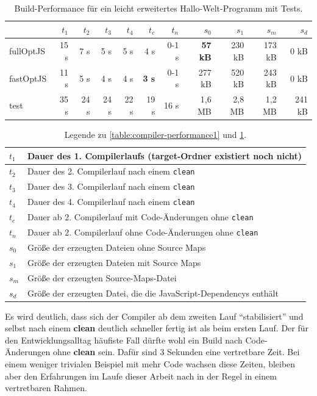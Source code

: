 \documentclass[a4paper, 12pt, hidelinks, listof=totoc, listoftables=totoc, bibliography=totoc]{scrreprt}
\newcommand{\code}[1]{\lstinline[language=Scala, style=inline]|#1|}
\begin{document}
\begin{table}[!h]
\begin{tabular}{|l|r|r|r|r|r|r||r|r|r|r|}
\hline           & $t_1$ & $t_2$ & $t_3$ & $t_4$ & $t_c$         & $t_n$ & $s_0$          & $s_1$  & $s_m$  & $s_d$ \\ 
\hline fullOptJS & 15 s  &  7 s  &  5 s  &  5 s  &          4 s  & 0-1 s & \textbf{57 kB} & 230 kB & 173 kB &   0 kB \\ 
\hline fastOptJS & 11 s  &  5 s  &  4 s  &  4 s  &  \textbf{3 s} & 0-1 s &        277 kB  & 520 kB & 243 kB &   0 kB \\ 
\hline test      & 35 s  & 24 s  & 24 s  & 22 s  &         19 s  &  16 s &        1,6 MB  & 2,8 MB & 1,2 MB & 241 kB \\ 
\hline 
\end{tabular} 
\caption{Build-Performance für ein leicht erweitertes Hallo-Welt-Programm mit Tests.}
\label{table:compiler-performance2}
\end{table}

\begin{table}[!h]
\begin{tabular}{|l|l|}
\hline $t_1$ & Dauer des 1. Compilerlaufs (target-Ordner existiert noch nicht) \\ 
\hline $t_2$ & Dauer des 2. Compilerlauf nach einem \code{clean} \\ 
\hline $t_3$ & Dauer des 3. Compilerlauf nach einem \code{clean} \\ 
\hline $t_4$ & Dauer des 4. Compilerlauf nach einem \code{clean} \\ 
\hline $t_c$ & Dauer ab 2. Compilerlauf mit Code-Änderungen ohne \code{clean} \\ 
\hline $t_n$ & Dauer ab 2. Compilerlauf ohne Code-Änderungen ohne \code{clean} \\ 
\hline $s_0$ & Größe der erzeugten Dateien ohne Source Maps \\ 
\hline $s_1$ & Größe der erzeugten Dateien mit Source Maps \\ 
\hline $s_m$ & Größe der erzeugten Source-Maps-Datei \\ 
\hline $s_d$ & Größe der erzeugten Datei, die die JavaScript-Dependencys enthält \\ 
\hline 
\end{tabular} 
\caption{Legende zu \ref{table:compiler-performance1} und \ref{table:compiler-performance2}.}
\label{table:compiler-performance-legend}
\end{table}

Es wird deutlich, dass sich der Compiler ab dem zweiten Lauf "`stabilisiert"' und selbst nach einem \textbf{clean} deutlich schneller fertig ist als beim ersten Lauf. Der für den Entwicklungsalltag häufiste Fall dürfte wohl ein Build nach Code-Änderungen ohne \textbf{clean} sein. Dafür sind 3 Sekunden eine vertretbare Zeit. Bei einem weniger trivialen Beispiel mit mehr Code wachsen diese Zeiten, bleiben aber den Erfahrungen im Laufe dieser Arbeit nach in der Regel in einem vertretbaren Rahmen.
\end{document}
